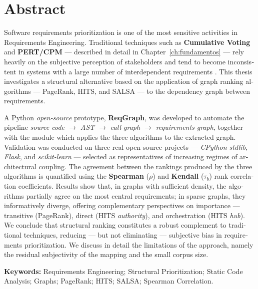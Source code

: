 \chapter*{Abstract}

\begin{otherlanguage}{english}
Software requirements prioritization is one of the most sensitive
activities in Requirements Engineering. Traditional techniques such
as \textbf{Cumulative Voting} and \textbf{PERT/CPM} --- described in
detail in Chapter~\ref{ch:fundamentos} --- rely heavily on the
subjective perception of stakeholders and tend to become inconsistent
in systems with a large number of interdependent requirements
\parencite{karlsson2002, silva2018}. This thesis investigates a
structural alternative based on the application of graph ranking
algorithms --- PageRank, HITS, and SALSA --- to the dependency graph
between requirements.

A Python \emph{open-source} prototype, \textbf{ReqGraph}, was
developed to automate the pipeline
\emph{source code \(\rightarrow\) AST \(\rightarrow\) call graph
\(\rightarrow\) requirements graph}, together with the 
module which applies the three algorithms to the extracted graph.
Validation was conducted on three real open-source projects ---
\emph{CPython stdlib}, \emph{Flask}, and \emph{scikit-learn} ---
selected as representatives of increasing regimes of architectural
coupling. The agreement between the rankings produced by the three
algorithms is quantified using the \textbf{Spearman} (\(\rho\)) and
\textbf{Kendall} (\(\tau_b\)) rank correlation coefficients. Results
show that, in graphs with sufficient density, the algorithms partially
agree on the most central requirements; in sparse graphs, they
informatively diverge, offering complementary perspectives on
importance --- transitive (PageRank), direct (HITS \emph{authority}),
and orchestration (HITS \emph{hub}). We conclude that structural
ranking constitutes a robust complement to traditional techniques,
reducing --- but not eliminating --- subjective bias in requirements
prioritization. We discuss in detail the limitations of the approach,
namely the residual subjectivity of the  mapping
and the small corpus size.

\vspace{0.3cm}
\noindent\textbf{Keywords:} Requirements Engineering; Structural
Prioritization; Static Code Analysis; Graphs; PageRank; HITS; SALSA;
Spearman Correlation.
\end{otherlanguage}
